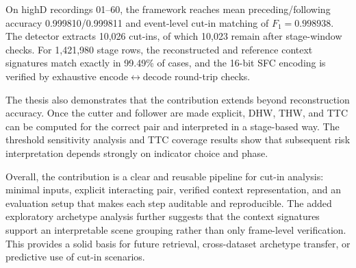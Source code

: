 \documentclass[12pt,a4paper,twoside,openright]{report}
\begin{document}
    On highD recordings 01--60, the framework reaches mean preceding/following accuracy 0.999810/0.999811 and event-level cut-in matching of $F_1 = 0.998938$. The detector extracts 10,026 cut-ins, of which 10,023 remain after stage-window checks. For 1,421,980 stage rows, the reconstructed and reference context signatures match exactly in 99.49\% of cases, and the 16-bit SFC encoding is verified by exhaustive encode$\leftrightarrow$decode round-trip checks.

    The thesis also demonstrates that the contribution extends beyond reconstruction accuracy. Once the cutter and follower are made explicit, DHW, THW, and TTC can be computed for the correct pair and interpreted in a stage-based way. The threshold sensitivity analysis and TTC coverage results show that subsequent risk interpretation depends strongly on indicator choice and phase.

    Overall, the contribution is a clear and reusable pipeline for cut-in analysis: minimal inputs, explicit interacting pair, verified context representation, and an evaluation setup that makes each step auditable and reproducible. The added exploratory archetype analysis further suggests that the context signatures support an interpretable scene grouping rather than only frame-level verification. This provides a solid basis for future retrieval, cross-dataset archetype transfer, or predictive use of cut-in scenarios.
\end{document}
